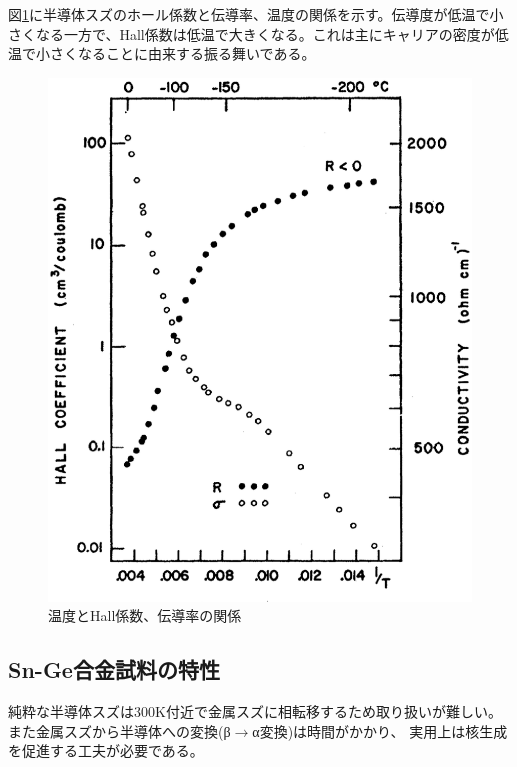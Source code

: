 図\ref{fig:conductivity}に半導体スズのホール係数と伝導率、温度の関係を示す。伝導度が低温で小さくなる一方で、Hall係数は低温で大きくなる。これは主にキャリアの密度が低温で小さくなることに由来する振る舞いである。
\begin{figure}[!h]
    \begin{center}
   \includegraphics[width=0.6\hsize]{Introduction/conductivity.eps}
  \end{center}
  \caption{温度とHall係数、伝導率の関係\cite{Kohnke}}
  \label{fig:conductivity}
\end{figure}

\subsection{Sn-Ge合金試料の特性}
純粋な半導体スズは300K付近で金属スズに相転移するため取り扱いが難しい。
また金属スズから半導体への変換(β$\to$α変換)は時間がかかり、%
実用上は核生成を促進する工夫が必要である。

